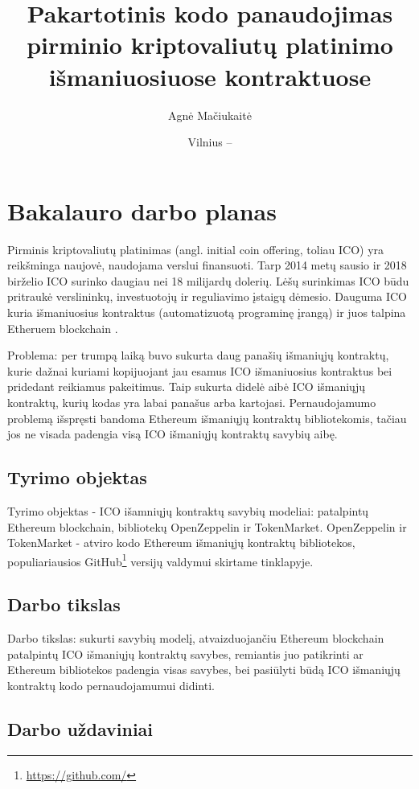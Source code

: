 \documentclass{VUMIFPSbakalaurinis}
\title{Pakartotinis kodo panaudojimas pirminio kriptovaliutų platinimo išmaniuosiuose kontraktuose}
\author{Agnė Mačiukaitė}
\date{Vilnius – \the\year}
\begin{document}
\maketitle

\tableofcontents
\section{Bakalauro darbo planas}


Pirminis kriptovaliutų platinimas (angl. initial coin offering, toliau ICO) yra reikšminga naujovė, naudojama verslui finansuoti. Tarp 2014 metų sausio ir 2018 birželio ICO surinko daugiau nei 18 milijardų dolerių. Lėšų surinkimas ICO būdu pritraukė verslininkų, investuotojų ir reguliavimo įstaigų dėmesio. Dauguma ICO kuria išmaniuosius kontraktus (automatizuotą programinę įrangą) ir juos talpina Etheruem blockchain \cite{Howell2018}.

Problema: per trumpą laiką buvo sukurta daug panašių išmaniųjų kontraktų, kurie dažnai kuriami kopijuojant jau esamus ICO išmaniuosius kontraktus bei pridedant reikiamus pakeitimus. Taip sukurta didelė aibė ICO išmaniųjų kontraktų, kurių kodas yra labai panašus arba kartojasi. Pernaudojamumo problemą išspręsti bandoma Ethereum išmaniųjų kontraktų bibliotekomis, tačiau jos ne visada padengia visą ICO išmaniųjų kontraktų savybių aibę.


\subsection{Tyrimo objektas}


Tyrimo objektas - ICO išamniųjų kontraktų savybių modeliai: patalpintų Ethereum blockchain, bibliotekų OpenZeppelin ir TokenMarket. OpenZeppelin ir TokenMarket - atviro kodo Ethereum išmaniųjų kontraktų bibliotekos, populiariausios GitHub\footnote{\url{https://github.com/}} versijų valdymui skirtame tinklapyje.

\subsection{Darbo tikslas}

Darbo tikslas: sukurti savybių modelį, atvaizduojančiu Ethereum blockchain patalpintų ICO išmaniųjų kontraktų savybes, remiantis juo patikrinti ar Ethereum bibliotekos padengia visas savybes, bei pasiūlyti būdą ICO išmaniųjų kontraktų kodo pernaudojamumui didinti.


\subsection{Darbo uždaviniai}
\end{document}
